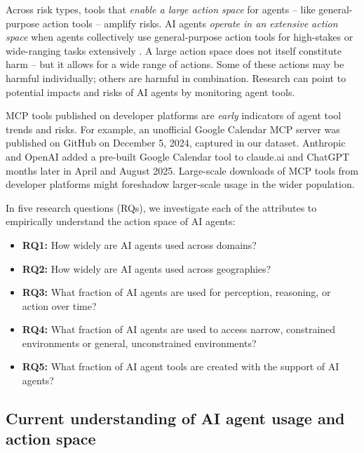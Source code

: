 \documentclass[manuscript,screen,nonacm,oneside]{acmart}
\begin{document}
Across risk types, tools that \textit{enable a large action space} for agents -- like general-purpose action tools -- amplify risks. AI agents \textit{operate in an extensive action space} when agents collectively use general-purpose action tools for high-stakes or wide-ranging tasks extensively \citep{mitchell2025fullyautonomousaiagents}. A large action space does not itself constitute harm -- but it allows for a wide range of actions. Some of these actions may be harmful individually; others are harmful in combination. Research can point to potential impacts and risks of AI agents by monitoring agent tools.

MCP tools published on developer platforms are \emph{early} indicators of agent tool trends and risks. For example, an unofficial Google Calendar MCP server was published on GitHub \citep{githubGitHubMarkelaugust74mcpgooglecalendar} on December 5, 2024, captured in our dataset. Anthropic \citep{Anthropic2025claude} and OpenAI \citep{openaiChatGPTRelease} added a pre-built Google Calendar tool to claude.ai and ChatGPT months later in April and August 2025. Large-scale downloads of MCP tools from developer platforms might foreshadow larger-scale usage in the wider population.

In five research questions (RQs), we investigate each of the attributes to empirically understand the action space of AI agents:
\begin{itemize}
    \item \textbf{RQ1:} How widely are AI agents used across domains?
    \item \textbf{RQ2:} How widely are AI agents used across geographies?
    \item \textbf{RQ3:} What fraction of AI agents are used for perception, reasoning, or action over time?
    \item \textbf{RQ4:} What fraction of AI agents are used to access narrow, constrained environments or general, unconstrained environments?
    \item \textbf{RQ5:} What fraction of AI agent tools are created with the support of AI agents?
\end{itemize}

\subsection{Current understanding of AI agent usage and action space}
\label{sec:current-understanding}
\end{document}
